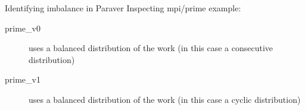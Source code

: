 \documentclass[10pt,xcolor=table]{beamer}
\begin{document}
\begin{frame}{Identifying imbalance in Paraver}
Inspecting mpi/prime example:

\begin{description}
\item[prime\_v0] uses a balanced distribution of the work (in this case a consecutive distribution)
\item[prime\_v1] uses a balanced distribution of the work (in this case a cyclic distribution)
\end{description}
    
\end{frame}
\end{document}
